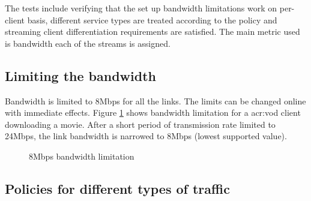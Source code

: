 \documentclass[11pt,openany]{book}
\begin{document}
      The tests include verifying that the set up bandwidth limitations work on per-client basis, different service
      types are treated according to the policy and streaming client differentiation requirements are satisfied. The
      main metric used is bandwidth each of the streams is assigned.


      \subsection{Limiting the bandwidth}
      \label{sub:uc:limit}

        Bandwidth is limited to 8Mbps for all the links. The limits can be changed online with immediate effects. Figure
        \ref{fig:uc:limit} shows bandwidth limitation for a \gls{acr:vod} client downloading a movie. After a short
        period of transmission rate limited to 24Mbps, the link bandwidth is narrowed to 8Mbps (lowest supported value).

        \begin{figure}[H]
          \centering


          \caption{8Mbps bandwidth limitation}
          \label{fig:uc:limit}
        \end{figure}


      \subsection{Policies for different types of traffic}
      \label{sub:uc:traffic}
\end{document}
